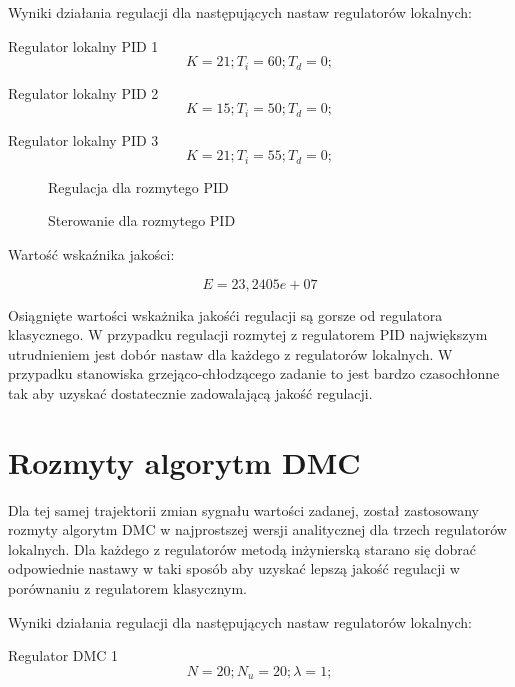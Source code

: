 Wyniki działania regulacji dla następujących nastaw regulatorów lokalnych:

Regulator lokalny PID 1
\begin{equation}
K = 21; 
T_i = 60; 
T_d = 0; 
\end{equation}

Regulator lokalny PID 2
\begin{equation}
K = 15; 
T_i = 50; 
T_d = 0; 
\end{equation}

Regulator lokalny PID 3
\begin{equation}
K = 21; 
T_i = 55; 
T_d = 0; 
\end{equation}

\begin{figure}[H]
\centering

\caption{Regulacja dla rozmytego PID}
\end{figure}

\begin{figure}[H]
\centering

\caption{Sterowanie dla rozmytego PID}
\end{figure}

Wartość wskaźnika jakości:

\begin{equation}
E =23,2405e+07
\end{equation}

Osiągnięte wartości wskażnika jakośći regulacji są gorsze od regulatora klasycznego. W przypadku regulacji rozmytej z regulatorem PID największym utrudnieniem jest 
dobór nastaw dla każdego z regulatorów lokalnych. W przypadku stanowiska grzejąco-chłodzącego zadanie to jest bardzo czasochłonne tak aby uzyskać dostatecznie zadowalającą jakość regulacji.

\section{Rozmyty algorytm DMC}

Dla tej samej trajektorii zmian sygnału wartości zadanej, został zastosowany rozmyty algorytm DMC w najprostszej wersji analitycznej dla trzech regulatorów lokalnych. Dla każdego z regulatorów metodą inżynierską starano się 
dobrać odpowiednie nastawy w taki sposób aby uzyskać lepszą jakość regulacji w porównaniu z regulatorem klasycznym.


Wyniki działania regulacji dla następujących nastaw regulatorów lokalnych:

Regulator DMC 1
\begin{equation}
N = 20; 
N_u = 20; 
\lambda = 1; 
\end{equation}

